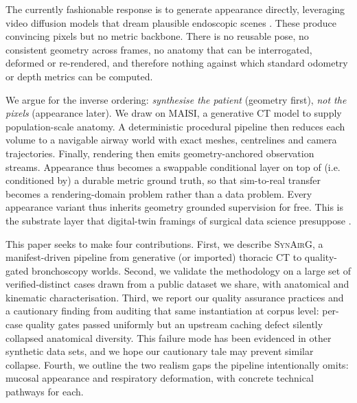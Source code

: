 \documentclass[conference]{IEEEtran}
\newcommand{\synairg}{\textsc{SynAirG}}
\begin{document}
The currently fashionable response is to generate appearance directly, leveraging video diffusion models that dream plausible endoscopic scenes \cite{li2024endora}. These produce convincing pixels but no metric backbone. There is no reusable pose, no consistent geometry across frames, no anatomy that can be interrogated, deformed or re-rendered, and therefore nothing against which standard odometry or depth metrics \cite{sturm2012tum,eigen2014depth} can be computed.

We argue for the inverse ordering: \emph{synthesise the patient} (geometry first), \emph{not the pixels} (appearance later). We draw on MAISI,\cite{zhao2026maisiv2} a generative CT model to supply population-scale anatomy. A deterministic procedural pipeline then reduces each volume to a navigable airway world with exact meshes, centrelines and camera trajectories. Finally, rendering then emits geometry-anchored observation streams. Appearance thus becomes a swappable conditional layer on top of (i.e. conditioned by) a durable metric ground truth, so that sim-to-real transfer \cite{tobin2017domain} becomes a rendering-domain problem rather than a data problem. Every appearance variant thus inherits geometry grounded supervision for free. This is the substrate layer that digital-twin framings of surgical data science presuppose \cite{ding2024digital}.

This paper seeks to make four contributions. First, we describe \synairg{}, a manifest-driven pipeline from generative (or imported) thoracic CT to quality-gated bronchoscopy worlds. Second, we validate the methodology on a large set of verified-distinct cases drawn from a public dataset we share, with anatomical and kinematic characterisation. Third, we report our quality assurance practices and a cautionary finding from auditing that same instantiation at corpus level: per-case quality gates passed uniformly but an upstream caching defect silently collapsed anatomical diversity. This failure mode has been evidenced in other synthetic data sets, and we hope our cautionary tale may prevent similar collapse. Fourth, we outline the two realism gaps the pipeline intentionally omits: mucosal appearance and respiratory deformation, with concrete technical pathways for each.
\end{document}
